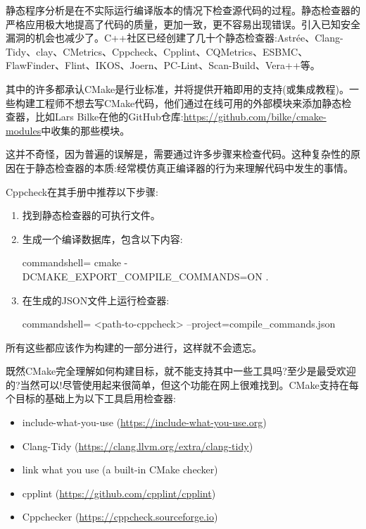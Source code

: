 
静态程序分析是在不实际运行编译版本的情况下检查源代码的过程。静态检查器的严格应用极大地提高了代码的质量，更加一致，更不容易出现错误。引入已知安全漏洞的机会也减少了。C++社区已经创建了几十个静态检查器:Astrée、Clang-Tidy、clay、CMetrics、Cppcheck、Cpplint、CQMetrics、ESBMC、FlawFinder、Flint、IKOS、Joern、PC-Lint、Scan-Build、Vera++等。

其中的许多都承认CMake是行业标准，并将提供开箱即用的支持(或集成教程)。一些构建工程师不想去写CMake代码，他们通过在线可用的外部模块来添加静态检查器，比如Lars Bilke在他的GitHub仓库:\url{https://github.com/bilke/cmake-modules}中收集的那些模块。

这并不奇怪，因为普遍的误解是，需要通过许多步骤来检查代码。这种复杂性的原因在于静态检查器的本质:经常模仿真正编译器的行为来理解代码中发生的事情。

Cppcheck在其手册中推荐以下步骤:

\begin{enumerate}
\item 
找到静态检查器的可执行文件。

\item 
生成一个编译数据库，包含以下内容:

\begin{tcblisting}{commandshell={}}
cmake -DCMAKE_EXPORT_COMPILE_COMMANDS=ON .
\end{tcblisting}

\item 
在生成的JSON文件上运行检查器:

\begin{tcblisting}{commandshell={}}
<path-to-cppcheck> --project=compile_commands.json
\end{tcblisting}
\end{enumerate}

所有这些都应该作为构建的一部分进行，这样就不会遗忘。

既然CMake完全理解如何构建目标，就不能支持其中一些工具吗?至少是最受欢迎的?当然可以!尽管使用起来很简单，但这个功能在网上很难找到。CMake支持在每个目标的基础上为以下工具启用检查器:

\begin{itemize}
\item 
include-what-you-use (\url{https://include-what-you-use.org})

\item 
Clang-Tidy (\url{https://clang.llvm.org/extra/clang-tidy})

\item 
link what you use (a built-in CMake checker)

\item 
cpplint (\url{https://github.com/cpplint/cpplint})

\item 
Cppchecker (\url{https://cppcheck.sourceforge.io})
\end{itemize}


